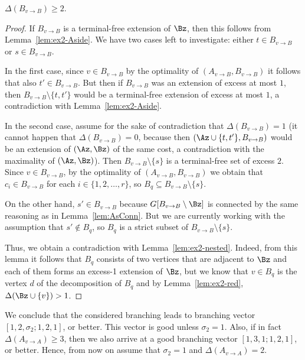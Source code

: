 \begin{myclaim}\label{cl:even-if-terminal1}
$\Delta(B_{v\to B})\geq 2$.
\end{myclaim}
\begin{proof}
If $B_{v\to B}$ is a terminal-free extension of $\Bz$, then this follows from Lemma~\ref{lem:ex2-Aside}. We have two cases left to investigate: either $t\in B_{v\to B}$ or $s\in B_{v\to B}$.

In the first case, since $v\in B_{v\to B}$ by the optimality of $(A_{v\to B},B_{v\to B})$ it follows that also $t'\in B_{v\to B}$. But then if $B_{v\to B}$ was an extension of excess at most $1$, then $B_{v\to B}\setminus \{t,t'\}$ would be a terminal-free extension of excess at most $1$, a contradiction with Lemma~\ref{lem:ex2-Aside}.

In the second case, assume for the sake of contradiction that $\Delta(B_{v\to B})=1$ (it cannot happen that $\Delta(B_{v\to B})=0$, because then $(\Az\cup \{t,t'\},B_{v\to B})$ would be an extension of $(\Az,\Bz)$ of the same cost, a contradiction with the maximality of $(\Az,\Bz)$). Then $B_{v\to B}\setminus \{s\}$ is a terminal-free set of excess $2$. Since $v\in B_{v\to B}$, by the optimality of $(A_{v\to B},B_{v\to B})$ we obtain that $c_i\in B_{v\to B}$ for each $i\in \{1,2,\ldots,r\}$, so $B_q\subseteq B_{v\to B}\setminus \{s\}$. 

On the other hand, $s'\in B_{v\to B}$ because $G[B_{v\to B}\setminus \Bz]$ is connected by the same reasoning as in Lemma~\ref{lem:AsConn}. But we are currently working with the assumption that $s'\notin B_q$, so $B_q$ is a strict subset of $B_{v\to B}\setminus \{s\}$. 

Thus, we obtain a contradiction with Lemma~\ref{lem:ex2-nested}. Indeed, from this lemma it follows that $B_q$ consists of two vertices that are adjacent to $\Bz$ and each of them forms an excess-1 extension of $\Bz$, but we know that $v\in B_q$ is the vertex $d$ of the decomposition of $B_q$ and by Lemma~\ref{lem:ex2-red}, $\Delta(\Bz\cup \{v\})>1$.
\end{proof}

We conclude that the considered branching leads to branching vector $[1,2,\sigma_2;1,2,1]$, or better. This vector is good unless $\sigma_2=1$. Also, if in fact $\Delta(A_{v\to A})\geq 3$, then we also arrive at a good branching vector $[1,3,1;1,2,1]$, or better. Hence, from now on assume that $\sigma_2=1$ and $\Delta(A_{v\to A})=2$.

